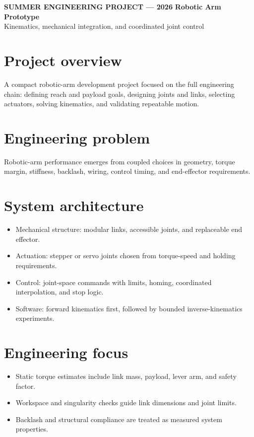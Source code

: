 \documentclass[10pt]{article}
\begin{document}
{\color{blue}\small\bfseries SUMMER ENGINEERING PROJECT --- 2026}
\vspace{0.4em}
{\color{navy}\LARGE\bfseries Robotic Arm Prototype}\\
{\color{muted}\large Kinematics, mechanical integration, and coordinated joint control}

\section*{Project overview}
A compact robotic-arm development project focused on the full engineering chain: defining reach and payload goals, designing joints and links, selecting actuators, solving kinematics, and validating repeatable motion.

\section*{Engineering problem}
Robotic-arm performance emerges from coupled choices in geometry, torque margin, stiffness, backlash, wiring, control timing, and end-effector requirements.

\section*{System architecture}
\begin{itemize}
\item Mechanical structure: modular links, accessible joints, and replaceable end effector.
\item Actuation: stepper or servo joints chosen from torque-speed and holding requirements.
\item Control: joint-space commands with limits, homing, coordinated interpolation, and stop logic.
\item Software: forward kinematics first, followed by bounded inverse-kinematics experiments.
\end{itemize}

\section*{Engineering focus}
\begin{itemize}
\item Static torque estimates include link mass, payload, lever arm, and safety factor.
\item Workspace and singularity checks guide link dimensions and joint limits.
\item Backlash and structural compliance are treated as measured system properties.
\end{itemize}
\end{document}

